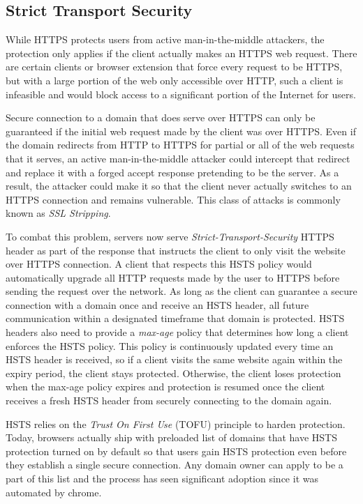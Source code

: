 \subsection{Strict Transport Security}
While HTTPS protects users from active man-in-the-middle attackers, the
protection only applies if the client actually makes an HTTPS web request.
There are certain clients or browser extension that force every request to be
HTTPS, but with a large portion of the web only accessible over HTTP, such a
client is infeasible and would block access to a significant portion of the
Internet for users.

Secure connection to a domain that does serve over HTTPS can only be guaranteed
if the initial web request made by the client was over HTTPS. Even if the
domain redirects from HTTP to HTTPS for partial or all of the web requests
that it serves, an active man-in-the-middle attacker could intercept that
redirect and replace it with a forged accept response pretending to be the
server. As a result, the attacker could make it so that the client never
actually switches to an HTTPS connection and remains vulnerable. This class of
attacks is commonly known as \emph{SSL Stripping}.

To combat this problem, servers now serve \emph{Strict-Transport-Security}
HTTPS header as part of the response that instructs the client to only visit
the website over HTTPS connection. A client that respects this HSTS policy
would automatically upgrade all HTTP requests made by the user to HTTPS before
sending the request over the network. As long as the client can guarantee a
secure connection with a domain once and receive an HSTS header, all future
communication within a designated timeframe that domain is protected. HSTS
headers also need to provide a \emph{max-age} policy that determines how long
a client enforces the HSTS policy. This policy is continuously updated every
time an HSTS header is received, so if a client visits the same website again
within the expiry period, the client stays protected. Otherwise, the client
loses protection when the max-age policy expires and protection is resumed once
the client receives a fresh HSTS header from securely connecting to the domain
again.

HSTS relies on the \emph{Trust On First Use} (TOFU) principle to harden
protection. Today, browsers actually ship with preloaded list of domains that
have HSTS protection turned on by default so that users gain HSTS protection
even before they establish a single secure connection. Any domain owner can
apply to be a part of this list and the process has seen significant adoption
since it was automated by chrome.


